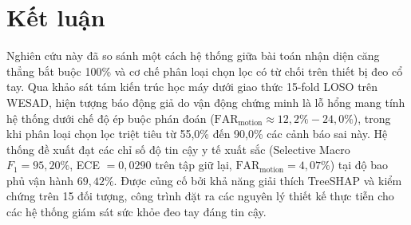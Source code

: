 \documentclass[conference]{IEEEtran}
\begin{document}
\section{Kết luận}
Nghiên cứu này đã so sánh một cách hệ thống giữa bài toán nhận diện căng thẳng bắt buộc 100\% và cơ chế phân loại chọn lọc có từ chối trên thiết bị đeo cổ tay. Qua khảo sát tám kiến trúc học máy dưới giao thức 15-fold LOSO trên WESAD, hiện tượng báo động giả do vận động chứng minh là lỗ hổng mang tính hệ thống dưới chế độ ép buộc phán đoán ($\text{FAR}_{\text{motion}} \approx 12,2\% - 24,0\%$), trong khi phân loại chọn lọc triệt tiêu từ 55,0\% đến 90,0\% các cảnh báo sai này. Hệ thống đề xuất đạt các chỉ số độ tin cậy y tế xuất sắc (Selective Macro $F_1 = 95,20\%$, ECE $= 0,0290$ trên tập giữ lại, $\text{FAR}_{\text{motion}} = 4,07\%$) tại độ bao phủ vận hành $69,42\%$. Được củng cố bởi khả năng giải thích TreeSHAP và kiểm chứng trên 15 đối tượng, công trình đặt ra các nguyên lý thiết kế thực tiễn cho các hệ thống giám sát sức khỏe đeo tay đáng tin cậy.
\end{document}

